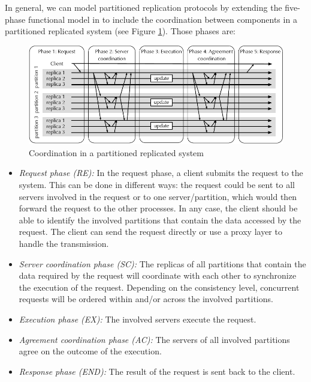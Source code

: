 

In general, we can model partitioned replication protocols by
extending the five-phase functional model in \cite{pedone:replication} to
include the coordination between components in a partitioned replicated system
(see Figure \ref{fig:replication:coordination}). Those phases are:


\begin{figure}[ht!]
  \begin{minipage}[b]{1.0\linewidth}
  \centering
        \includegraphics[width=1\linewidth]{figures/replication-coordination}
  \end{minipage}
  \caption{Coordination in a partitioned replicated system}
  \label{fig:replication:coordination}
\end{figure}

\begin{itemize}
  \item \textit{Request phase (RE):} In the request phase, a client submits the request
     to the system. This can be done in different ways: the request could
  be sent to all servers involved in the request or to one server/partition, which would
  then forward the request to the other processes. In any case, the client should
  be able to identify the involved partitions that contain the data accessed by
  the request. The client can send the request directly or use a proxy layer to
  handle the transmission.
  \item \textit{Server coordination phase (SC):} The replicas of all partitions
  that contain the data required by the request will coordinate with each other
  to synchronize the execution of the request. Depending on the consistency level,  
  concurrent requests will be ordered within and/or across the involved partitions.
  \item \textit{Execution phase (EX):} The involved servers execute the request.
  \item \textit{Agreement coordination phase (AC):} The servers of all involved
  partitions agree on the outcome of the execution.
  \item \textit{Response phase (END):} The result of the request is sent back to the client.
\end{itemize}

